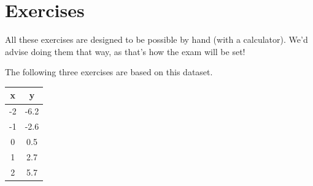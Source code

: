 \documentclass{article}
\newcommand{\bracket}[3]{\left#1 #3 \right#2}
\renewcommand{\b}{\bracket{(}{)}}
\newcommand{\x}{\mathbf{x}}
\newcommand{\y}{\mathbf{y}}
\newcommand{\X}{\mathbf{X}}
\newcommand{\I}{\mathbf{I}}
\newcommand{\w}{\mathbf{w}}
\newcommand{\wo}{\w^*}
\renewcommand{\L}{\mathcal{L}}
\begin{document}




\section{Exercises}
All these exercises are designed to be possible by hand (with a calculator).  We'd advise doing them that way, as that's how the exam will be set!

The following three exercises are based on this dataset.

\begin{center}
\begin{tabular}{c c}
  \toprule
  x & y \\
  \midrule
  -2 & -6.2\\
  -1 & -2.6\\
  0 &  0.5\\
  1 & 2.7\\
  2 & 5.7\\
  \bottomrule
\end{tabular}
\end{center}
\end{document}
